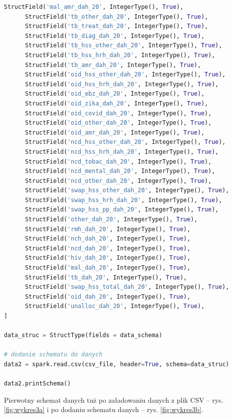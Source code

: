 \documentclass[11pt]{report}
\begin{document}
\begin{lstlisting}[language=Python]
      StructField('mal_amr_dah_20', IntegerType(), True),
      StructField('tb_other_dah_20', IntegerType(), True),
      StructField('tb_treat_dah_20', IntegerType(), True),
      StructField('tb_diag_dah_20', IntegerType(), True),
      StructField('tb_hss_other_dah_20', IntegerType(), True),
      StructField('tb_hss_hrh_dah_20', IntegerType(), True),
      StructField('tb_amr_dah_20', IntegerType(), True),
      StructField('oid_hss_other_dah_20', IntegerType(), True),
      StructField('oid_hss_hrh_dah_20', IntegerType(), True),
      StructField('oid_ebz_dah_20', IntegerType(), True),
      StructField('oid_zika_dah_20', IntegerType(), True),
      StructField('oid_covid_dah_20', IntegerType(), True),
      StructField('oid_other_dah_20', IntegerType(), True),
      StructField('oid_amr_dah_20', IntegerType(), True),
      StructField('ncd_hss_other_dah_20', IntegerType(), True),
      StructField('ncd_hss_hrh_dah_20', IntegerType(), True),
      StructField('ncd_tobac_dah_20', IntegerType(), True),
      StructField('ncd_mental_dah_20', IntegerType(), True),
      StructField('ncd_other_dah_20', IntegerType(), True),
      StructField('swap_hss_other_dah_20', IntegerType(), True),
      StructField('swap_hss_hrh_dah_20', IntegerType(), True),
      StructField('swap_hss_pp_dah_20', IntegerType(), True),
      StructField('other_dah_20', IntegerType(), True),
      StructField('rmh_dah_20', IntegerType(), True),
      StructField('nch_dah_20', IntegerType(), True),
      StructField('ncd_dah_20', IntegerType(), True),
      StructField('hiv_dah_20', IntegerType(), True),
      StructField('mal_dah_20', IntegerType(), True),
      StructField('tb_dah_20', IntegerType(), True),
      StructField('swap_hss_total_dah_20', IntegerType(), True),
      StructField('oid_dah_20', IntegerType(), True),
      StructField('unalloc_dah_20', IntegerType(), True),  
]

data_struc = StructType(fields = data_schema)

# dodanie schematu do danych
data2 = spark.read.csv(csv_file, header=True, schema=data_struc)

data2.printSchema()
\end{lstlisting}

Pierwotny schemat danych tuż po załadowaniu danych z plik CSV -- rys. \ref{fig:wykres3a} i po dodaniu schematu danych -- rys. \ref{fig:wykres3b}.
\end{document}
